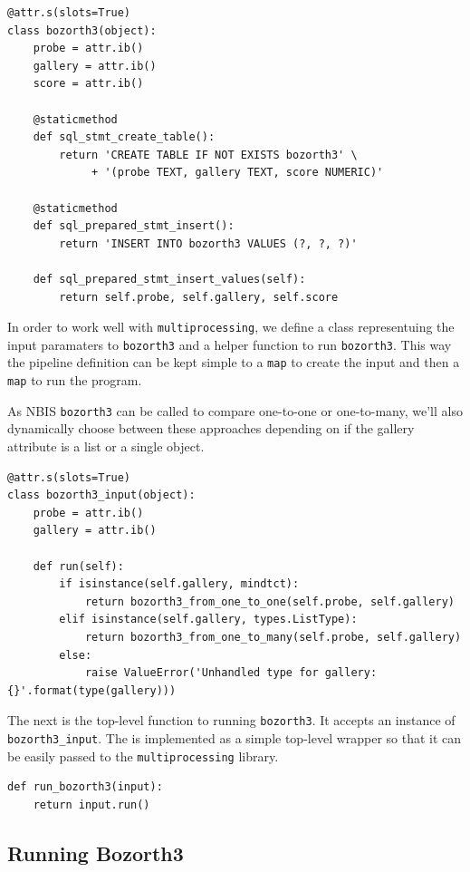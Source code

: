 \begin{lstlisting}
@attr.s(slots=True)
class bozorth3(object):
    probe = attr.ib()
    gallery = attr.ib()
    score = attr.ib()

    @staticmethod
    def sql_stmt_create_table():
        return 'CREATE TABLE IF NOT EXISTS bozorth3' \
             + '(probe TEXT, gallery TEXT, score NUMERIC)'

    @staticmethod
    def sql_prepared_stmt_insert():
        return 'INSERT INTO bozorth3 VALUES (?, ?, ?)'

    def sql_prepared_stmt_insert_values(self):
        return self.probe, self.gallery, self.score
\end{lstlisting}

In order to work well with \texttt{multiprocessing}, we define a class
representuing the input paramaters to \texttt{bozorth3} and a helper
function to run \texttt{bozorth3}. This way the pipeline definition can
be kept simple to a \texttt{map} to create the input and then a
\texttt{map} to run the program.

As NBIS \texttt{bozorth3} can be called to compare one-to-one or
one-to-many, we'll also dynamically choose between these approaches
depending on if the gallery attribute is a list or a single object.

\begin{lstlisting}
@attr.s(slots=True)
class bozorth3_input(object):
    probe = attr.ib()
    gallery = attr.ib()

    def run(self):
        if isinstance(self.gallery, mindtct):
            return bozorth3_from_one_to_one(self.probe, self.gallery)
        elif isinstance(self.gallery, types.ListType):
            return bozorth3_from_one_to_many(self.probe, self.gallery)
        else:
            raise ValueError('Unhandled type for gallery: {}'.format(type(gallery)))
\end{lstlisting}

The next is the top-level function to running \texttt{bozorth3}. It
accepts an instance of \texttt{bozorth3\_input}. The is implemented as a
simple top-level wrapper so that it can be easily passed to the
\texttt{multiprocessing} library.

\begin{lstlisting}
def run_bozorth3(input):
    return input.run()
\end{lstlisting}

\subsection{Running Bozorth3}\label{running-bozorth3}

